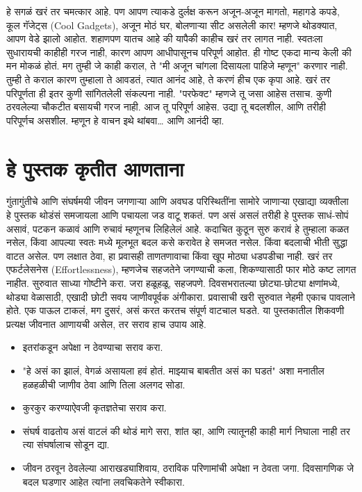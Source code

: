 हे सगळं खरं तर चमत्कार आहे. पण आपण त्याकडे दुर्लक्ष करून अजून-अजून मागतो,  महागडे कपडे, कूल गॅजेट्स (Cool Gadgets), अजून मोठं घर, बोलणाऱ्या सीट असलेली कार! म्हणजे थोडक्यात, आपण वेडे झालो आहोत.
शहाणपण यातच आहे की यापैकी काहीच खरं तर लागत नाही. स्वतःला सुधारायची काहीही गरज नाही, कारण आपण आधीपासूनच परिपूर्ण आहोत.
ही गोष्ट एकदा मान्य केली की मन मोकळं होतं.
मग तुम्ही जे काही कराल, ते "मी अजून चांगला दिसायला पाहिजे म्हणून" करणार नाही. तुम्ही ते कराल कारण तुम्हाला ते आवडतं, त्यात आनंद आहे, ते करणं हीच एक कृपा आहे.
खरं तर परिपूर्णता ही इतर कुणी सांगितलेली संकल्पना नाही. "परफेक्ट" म्हणजे तू जसा आहेस तसाच. कुणी ठरवलेल्या चौकटीत बसायची गरज नाही.
आज तू परिपूर्ण आहेस. उद्या तू बदलशील, आणि तरीही परिपूर्णच असशील.
म्हणून हे वाचन इथे थांबवा… आणि आनंदी व्हा.

 \chapter{हे पुस्तक कृतीत आणताना}
गुंतागुंतीचे आणि संघर्षमयी जीवन जगणाऱ्या आणि अवघड परिस्थितींना सामोरे जाणाऱ्या एखाद्या व्यक्तीला हे पुस्तक थोडंसं समजायला आणि पचायला जड वाटू शकतं. पण असं असलं तरीही हे पुस्तक साधं-सोपं असावं, पटकन कळावं आणि रुचावं म्हणूनच लिहिलेलं आहे.
कदाचित कुठून सुरु करावं हे तुम्हाला कळत नसेल, किंवा आपल्या स्वतः मध्ये मूलभूत बदल कसे करावेत हे समजत नसेल. किंवा बदलाची भीती सुद्धा वाटत असेल. पण लक्षात ठेवा,  हा प्रवासही ताणतणावाचा किंवा खूप मोठ्या धडपडीचा नाही. खरं तर एफर्टलेसनेस (Effortlessness),  म्हणजेच सहजतेने जगण्याची कला,  शिकण्यासाठी फार मोठे कष्ट लागत नाहीत.
सुरुवात साध्या गोष्टीने करा. जरा हळूहळू, सहजपणे. दिवसभरातल्या छोट्या-छोट्या क्षणांमध्ये, थोड्या वेळासाठी, एखादी छोटी सवय जाणीवपूर्वक अंगीकारा.
प्रवासाची खरी सुरुवात नेहमी एकाच पावलाने होते. एक पाऊल टाकलं, मग दुसरं,  असं करत करतच संपूर्ण वाटचाल घडते.
या पुस्तकातील शिकवणी प्रत्यक्ष जीवनात आणायची असेल, तर सराव हाच उपाय आहे.
 \begin{itemize}
 \item इतरांकडून अपेक्षा न ठेवण्याचा सराव करा.
 \item "हे असं का झालं, वेगळं असायला हवं होतं. माझ्याच बाबतीत असं का घडतं" अशा मनातील हळहळीची जाणीव ठेवा आणि तिला अलगद सोडा.
 \item कुरकुर करण्याऐवजी कृतज्ञतेचा सराव करा.
 \item संघर्ष वाढतोय असं वाटलं की थोडं मागे सरा, शांत व्हा, आणि त्यातूनही काही मार्ग निघाला नाही तर त्या संघर्षालाच सोडून द्या.
 \item जीवन ठरवून ठेवलेल्या आराखड्याशिवाय, ठराविक परिणामांची अपेक्षा न ठेवता जगा. दिवसागणिक जे बदल घडणार आहेत त्यांना लवचिकतेने स्वीकारा.
 \end{itemize}
